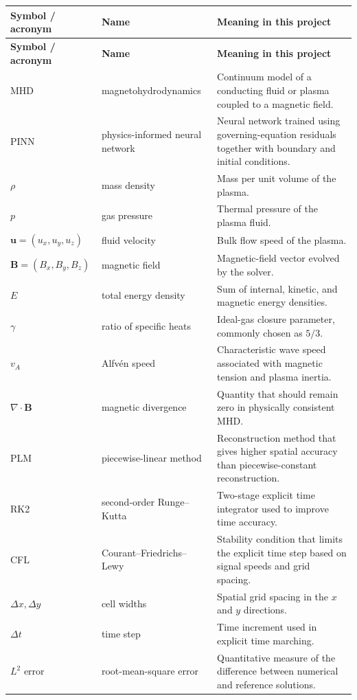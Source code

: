 \documentclass[11pt]{article}
\begin{document}
\begin{longtable}{>{\raggedright\arraybackslash}p{} >{\raggedright\arraybackslash}p{} >{\raggedright\arraybackslash}p{}}
\toprule
\textbf{Symbol / acronym} & \textbf{Name} & \textbf{Meaning in this project} \\
\midrule
\endfirsthead
\toprule
\textbf{Symbol / acronym} & \textbf{Name} & \textbf{Meaning in this project} \\
\midrule
\endhead
MHD & magnetohydrodynamics & Continuum model of a conducting fluid or plasma coupled to a magnetic field. \\
PINN & physics-informed neural network & Neural network trained using governing-equation residuals together with boundary and initial conditions. \\
$\rho$ & mass density & Mass per unit volume of the plasma. \\
$p$ & gas pressure & Thermal pressure of the plasma fluid. \\
$\mathbf{u}=(u_x,u_y,u_z)$ & fluid velocity & Bulk flow speed of the plasma. \\
$\mathbf{B}=(B_x,B_y,B_z)$ & magnetic field & Magnetic-field vector evolved by the solver. \\
$E$ & total energy density & Sum of internal, kinetic, and magnetic energy densities. \\
$\gamma$ & ratio of specific heats & Ideal-gas closure parameter, commonly chosen as $5/3$. \\
$v_A$ & Alfv\'en speed & Characteristic wave speed associated with magnetic tension and plasma inertia. \\
$\nabla\cdot\mathbf{B}$ & magnetic divergence & Quantity that should remain zero in physically consistent MHD. \\
PLM & piecewise-linear method & Reconstruction method that gives higher spatial accuracy than piecewise-constant reconstruction. \\
RK2 & second-order Runge--Kutta & Two-stage explicit time integrator used to improve time accuracy. \\
CFL & Courant--Friedrichs--Lewy & Stability condition that limits the explicit time step based on signal speeds and grid spacing. \\
$\Delta x, \Delta y$ & cell widths & Spatial grid spacing in the $x$ and $y$ directions. \\
$\Delta t$ & time step & Time increment used in explicit time marching. \\
$L^2$ error & root-mean-square error & Quantitative measure of the difference between numerical and reference solutions. \\
\bottomrule
\end{longtable}
\end{document}
